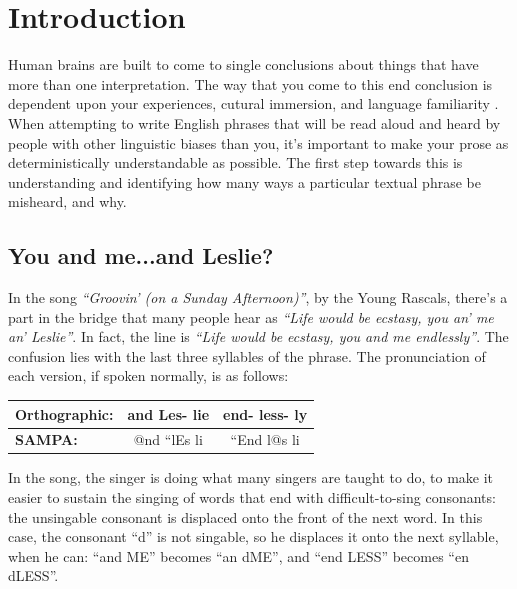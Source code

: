 \chapter{Introduction}
\label{intro}

Human brains are built to come to single conclusions about things that have more than one interpretation.  The way that you come to this end conclusion is dependent upon your experiences, cutural immersion, and language familiarity \cite{smith_music_2003}. When attempting to write English phrases that will be read aloud and heard by people with other linguistic biases than you, it's important to make your prose as deterministically understandable as possible. The first step towards this is understanding and identifying how many ways a particular textual phrase be misheard, and why.


\section{You and me...and Leslie?}
\label{sect:youAndMeAndLeslie}

In the song \textit{``Groovin' (on a Sunday Afternoon)''}, by the Young Rascals, there's a part in the bridge that many people hear as \textit{``Life would be ecstasy, you an' me an' Leslie''}. In fact, the line is \textit{``Life would be ecstasy, you and me endlessly''}. The confusion lies with the last three syllables of the phrase. The pronunciation of each version, if spoken normally, is as follows:



\begin{center}
    \begin{tabular}{|l|c|c|}
        \hline
        \textbf{Orthographic:} & and       Les-   lie & end-       less-       ly \\ 
        \hline
        \textbf{SAMPA:}      & @nd   ``lEs     li   & ``End      l@s       li   \\
        \hline
    \end{tabular}
\label{table:groovinAlphaSAMPA}
\end{center}


In the song, the singer is doing what many singers are taught to do, to make it easier to sustain the singing of words that end with difficult-to-sing consonants: the unsingable consonant is displaced onto the front of the next word. In this case, the consonant ``d'' is not singable, so he displaces it onto the next syllable, when he can: ``and ME'' becomes ``an dME'', and ``end LESS'' becomes ``en dLESS''. 


